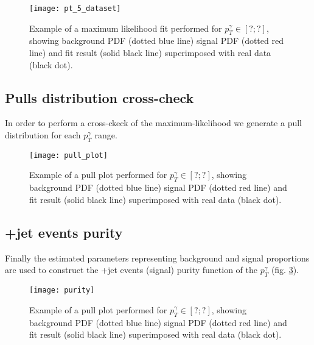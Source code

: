 \begin{figure}[h!]
\centering
    \texttt{[image: pt\_5\_dataset]}
    \caption{Example of a maximum likelihood fit performed for $p_T^\gamma \in [ ?;? ]$, showing background PDF (dotted
    blue line) signal PDF (dotted red line) and fit result (solid black line) superimposed with real data (black dot).}
    \label{pt_5_dataset}
\end{figure}

\subsection{Pulls distribution cross-check}

In order to perform a cross-ckeck of the maximum-likelihood we generate a pull distribution for each $p_T^\gamma$ range.

\begin{figure}[h!]
\centering
    \texttt{[image: pull\_plot]}
    \caption{Example of a pull plot performed for $p_T^\gamma \in [ ?;? ]$, showing background PDF (dotted
    blue line) signal PDF (dotted red line) and fit result (solid black line) superimposed with real data (black dot).}
    \label{pull_plot}
\end{figure}

\subsection{\textgamma+jet events purity}

Finally the estimated parameters representing background and signal proportions are used to construct the \textgamma+jet
events (signal) purity function of the $p_T^\gamma$ (fig. \ref{purity}).
\begin{figure}[h!]
\centering
    \texttt{[image: purity]}
    \caption{Example of a pull plot performed for $p_T^\gamma \in [ ?;? ]$, showing background PDF (dotted
    blue line) signal PDF (dotted red line) and fit result (solid black line) superimposed with real data (black dot).}
    \label{purity}
\end{figure}

